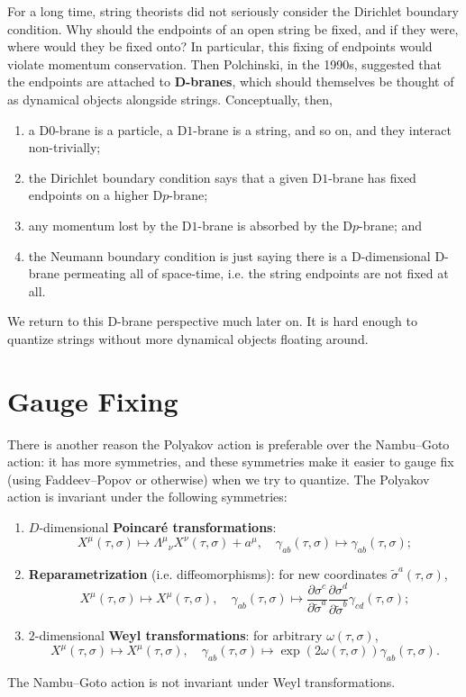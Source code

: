 \documentclass{report}
\theoremstyle{plain}
\theoremstyle{definition}
\theoremstyle{remark}
\newcommand{\pder}[2]{\frac{\partial #1}{\partial #2}}
\begin{document}
For a long time, string theorists did not seriously consider the
Dirichlet boundary condition. Why should the endpoints of an open
string be fixed, and if they were, where would they be fixed onto? In
particular, this fixing of endpoints would violate momentum
conservation. Then Polchinski, in the 1990s, suggested that the
endpoints are attached to {\bf D-branes}, which should themselves be
thought of as dynamical objects alongside strings. Conceptually, then,
\begin{enumerate}
\item a D$0$-brane is a particle, a D$1$-brane is a string, and so on,
  and they interact non-trivially;
\item the Dirichlet boundary condition says that a given D$1$-brane
  has fixed endpoints on a higher D$p$-brane;
\item any momentum lost by the D$1$-brane is absorbed by the
  D$p$-brane; and
\item the Neumann boundary condition is just saying there is a
  D-dimensional D-brane permeating all of space-time, i.e. the string
  endpoints are not fixed at all.
\end{enumerate}
We return to this D-brane perspective much later on. It is hard enough
to quantize strings without more dynamical objects floating around.

\section{Gauge Fixing}

There is another reason the Polyakov action is preferable over the
Nambu--Goto action: it has more symmetries, and these symmetries make
it easier to gauge fix (using Faddeev--Popov or otherwise) when we try
to quantize. The Polyakov action is invariant under the following
symmetries:
\begin{enumerate}
\item $D$-dimensional {\bf Poincar\'e transformations}:
  \[ X^\mu(\tau, \sigma) \mapsto \Lambda^\mu{}_\nu X^\nu(\tau, \sigma) + a^\mu, \quad \gamma_{ab}(\tau, \sigma) \mapsto \gamma_{ab}(\tau, \sigma); \]
\item {\bf Reparametrization} (i.e. diffeomorphisms): for new
  coordinates $\tilde{\sigma}^a(\tau, \sigma)$,
  \[ X^\mu(\tau, \sigma) \mapsto X^\mu(\tau,\sigma), \quad \gamma_{ab}(\tau, \sigma) \mapsto \pder{\sigma^c}{\tilde{\sigma}^a} \pder{\sigma^d}{\tilde{\sigma}^b} \gamma_{cd}(\tau, \sigma); \]
\item $2$-dimensional {\bf Weyl transformations}: for arbitrary
  $\omega(\tau, \sigma)$,
  \[ X^\mu(\tau, \sigma) \mapsto X^\mu(\tau,\sigma), \quad \gamma_{ab}(\tau, \sigma) \mapsto \exp(2\omega(\tau, \sigma)) \gamma_{ab}(\tau, \sigma). \]
\end{enumerate}
The Nambu--Goto action is not invariant under Weyl transformations.
\end{document}
